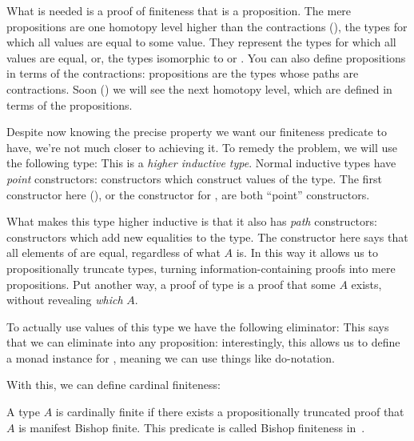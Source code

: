 
What is needed is a proof of finiteness that is a proposition.
The mere propositions are one homotopy level higher than the contractions
(), the types for which all values are equal to some value.
They represent the types for which all values are equal, or, the types
isomorphic to \agdabot\;or \agdatop.
You can also define propositions in terms of the contractions: propositions are
the types whose paths are contractions.
Soon () we will see the next homotopy level, which are
defined in terms of the propositions.

Despite now knowing the precise property we want our finiteness predicate to
have, we're not much closer to achieving it.
To remedy the problem, we will use the following type:
This is a \emph{higher inductive type}.
Normal inductive types have \emph{point} constructors: constructors which
construct values of the type.
The first constructor here (\AgdaInductiveConstructor{\ensuremath{\lvert \_
    \rvert}}), or the constructor  for
, are both ``point'' constructors.

What makes this type higher inductive is that it also has \emph{path}
constructors: constructors which add new equalities to the type. 
The  constructor here says that all elements of
are equal, regardless of what \(A\) is.
In this way it allows us to propositionally truncate types, turning
information-containing proofs into mere propositions.
Put another way, a proof of type 
is a proof that some \(A\) exists, without revealing \emph{which} \(A\).

To actually use values of this type we have the following eliminator:
This says that we can eliminate into any proposition: interestingly, this allows
us to define a monad instance for \AgdaDatatype{\(\lVert \_ \rVert\)}, meaning
we can use things like do-notation.

With this, we can define cardinal finiteness:
\begin{definition}\label{card-finite-def}
  A type \(A\) is cardinally finite if there exists a propositionally truncated
  proof that \(A\) is manifest Bishop finite.
  This predicate is called Bishop finiteness in~\citet{fruminFiniteSetsHomotopy2018}.
\end{definition}

